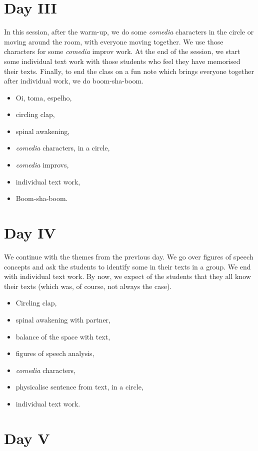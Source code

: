 \documentclass[article,twocolumn,twoside]{memoir}
\begin{document}
\section{Day III}
In this session, after the warm-up, we do some \textit{comedia} characters in
the circle or moving around the room, with everyone moving together. We use
those characters for some \textit{comedia} improv work. At the end of the
session, we start some individual text work with those students who feel they
have memorised their texts. Finally, to end the class on a fun note which
brings everyone together after individual work, we do boom-sha-boom.

\begin{itemize}
\item Oi, toma, espelho,
\item circling clap,
\item spinal awakening,
\item \textit{comedia} characters, in a circle,
\item \textit{comedia} improvs,
\item individual text work,
\item Boom-sha-boom.
\end{itemize}
\section{Day IV}

We continue with the themes from the previous day. We go over figures of speech
concepts and ask the students to identify some in their texts in a group. We
end with individual text work. By now, we expect of the students that they all
know their texts (which was, of course, not always the case).

\begin{itemize}
\item Circling clap,
\item spinal awakening with partner,
\item balance of the space with text,
\item figures of speech analysis,
\item \textit{comedia} characters,
\item physicalise sentence from text, in a circle,
\item individual text work.
\end{itemize}
\section{Day V}
\end{document}

